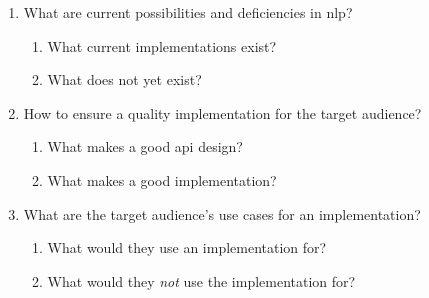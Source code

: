\begin{enumerate}
\item\label{list:research-question-context}
  What are current possibilities and deficiencies in \gls{nlp}?
  \begin{enumerate}
    \item What current implementations exist?
    \item What does not yet exist?
  \end{enumerate}
\item\label{list:research-question-implementation}
  How to ensure a quality implementation for the target audience?
  \begin{enumerate}
    \item What makes a good \gls{api} design?
    \item What makes a good implementation?
  \end{enumerate}
\item\label{list:research-question-audience}
  What are the target audience's use cases for an implementation?
  \begin{enumerate}
    \item What would they use an implementation for?
    \item What would they \emph{not} use the implementation for?
  \end{enumerate}
\end{enumerate}
